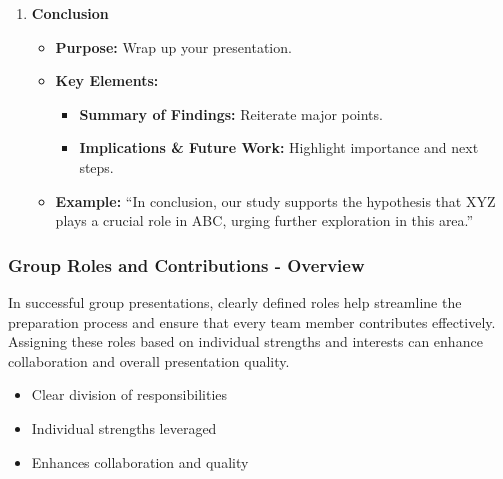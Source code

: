 \documentclass{beamer}
\begin{document}
\begin{frame}[fragile]
\begin{enumerate}
        \item \textbf{Conclusion}
            \begin{itemize}
                \item \textbf{Purpose:} Wrap up your presentation.
                \item \textbf{Key Elements:}
                    \begin{itemize}
                        \item \textbf{Summary of Findings:} Reiterate major points.
                        \item \textbf{Implications \& Future Work:} Highlight importance and next steps.
                    \end{itemize}
                \item \textbf{Example:} 
                    “In conclusion, our study supports the hypothesis that XYZ plays a crucial role in ABC, urging further exploration in this area.”
            \end{itemize}
    \end{enumerate}
\end{frame}

\begin{frame}[fragile]
    \frametitle{Group Roles and Contributions - Overview}
    In successful group presentations, clearly defined roles help streamline the preparation process and ensure that every team member contributes effectively. Assigning these roles based on individual strengths and interests can enhance collaboration and overall presentation quality.
    
    \begin{itemize}
        \item Clear division of responsibilities 
        \item Individual strengths leveraged 
        \item Enhances collaboration and quality
    \end{itemize}
\end{frame}
\end{document}
